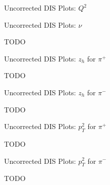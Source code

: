 \begin{frame}{Uncorrected DIS Plots: $Q^2$}
    \label{20.10a::q2}

    \begin{figure}[t]
    \end{figure}

\end{frame}

\begin{frame}{Uncorrected DIS Plots: $\nu$}
    \label{20.10b::nu}

    TODO

\end{frame}

\begin{frame}{Uncorrected DIS Plots: $z_h$ for $\pi^+$}
    \label{20.10c::zh_pi+}

    TODO

\end{frame}

\begin{frame}{Uncorrected DIS Plots: $z_h$ for $\pi^-$}
    \label{20.10d::zh_pi-}

    TODO

\end{frame}

\begin{frame}{Uncorrected DIS Plots: $p_T^2$ for $\pi^+$}
    \label{20.10e::pt2_pi+}

    TODO

\end{frame}

\begin{frame}{Uncorrected DIS Plots: $p_T^2$ for $\pi^-$}
    \label{20.10f::pt2_pi-}

    TODO

\end{frame}

